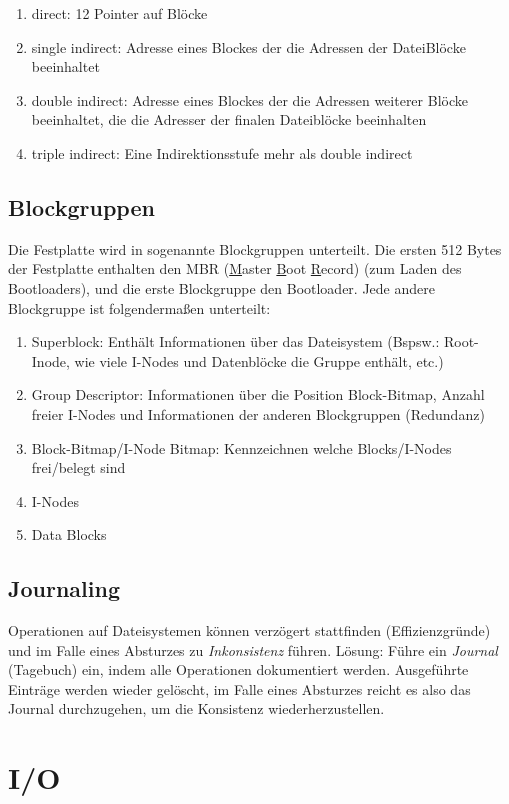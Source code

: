 \documentclass[11pt]{scrartcl}
\begin{document}
\begin{enumerate}
	\item{direct: 12 Pointer auf Blöcke}
	\item{single indirect: Adresse eines Blockes der die Adressen der DateiBlöcke beeinhaltet}
	\item{double indirect: Adresse eines Blockes der die Adressen weiterer Blöcke beeinhaltet, die die Adresser der finalen Dateiblöcke beeinhalten}
	\item{triple indirect: Eine Indirektionsstufe mehr als double indirect}
\end{enumerate}

\subsection{Blockgruppen}
Die Festplatte wird in sogenannte Blockgruppen unterteilt. Die ersten 512 Bytes der Festplatte enthalten den MBR (\underline Master \underline Boot \underline Record) (zum Laden des Bootloaders), und die erste Blockgruppe den Bootloader. Jede andere Blockgruppe ist folgendermaßen unterteilt:

\begin{enumerate}
	\item{Superblock: Enthält Informationen über das Dateisystem (Bspsw.: Root-Inode, wie viele I-Nodes und Datenblöcke die Gruppe enthält, etc.)}
	\item{Group Descriptor: Informationen über die Position Block-Bitmap, Anzahl freier I-Nodes und Informationen der anderen Blockgruppen (Redundanz)}
	\item{Block-Bitmap/I-Node Bitmap: Kennzeichnen welche Blocks/I-Nodes frei/belegt sind}
	\item{I-Nodes}
	\item{Data Blocks}
\end{enumerate}

\subsection{Journaling}
Operationen auf Dateisystemen können verzögert stattfinden (Effizienzgründe) und im Falle eines Absturzes zu \textit{Inkonsistenz} führen. Lösung: Führe ein \textit{Journal} (Tagebuch) ein, indem alle Operationen dokumentiert werden. Ausgeführte Einträge werden wieder gelöscht, im Falle eines Absturzes reicht es also das Journal durchzugehen, um die Konsistenz wiederherzustellen.

\section{I/O}
\end{document}
